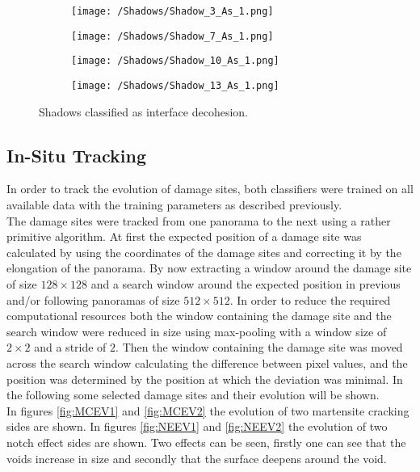 \begin{figure}[H]
\centering
\begin{subfigure}{0.24\textwidth}
\texttt{[image: /Shadows/Shadow\_3\_As\_1.png]}
\caption{}
\end{subfigure}
\centering
\begin{subfigure}{0.24\textwidth}
\texttt{[image: /Shadows/Shadow\_7\_As\_1.png]}
\caption{}
\end{subfigure}
\centering
\begin{subfigure}{0.24\textwidth}
\texttt{[image: /Shadows/Shadow\_10\_As\_1.png]}
\caption{}
\end{subfigure}
\centering
\begin{subfigure}{0.24\textwidth}
\texttt{[image: /Shadows/Shadow\_13\_As\_1.png]}
\caption{}
\end{subfigure}
\caption{Shadows classified as interface decohesion.}
\label{fig:shadowAsID}
\end{figure}


\subsection{In-Situ Tracking}
In order to track the evolution of damage sites, both classifiers were trained on all available data with the training parameters as described previously. \\

The damage sites were tracked from one panorama to the next using a rather primitive algorithm. At first the expected position of a damage site was calculated by using the coordinates of the damage sites and correcting it by the elongation of the panorama. By now extracting a window around the damage site of size $128\times 128$ and a search window around the expected position in previous and/or following panoramas of size $512 \times 512$. In order to reduce the required computational resources both the window containing the damage site and the search window were reduced in size using max-pooling with a window size of $2\times 2$ and a stride of $2$. Then the window containing the damage site was moved across the search window calculating the difference between pixel values, and the position was determined by the position at which the deviation was minimal. In the following some selected damage sites and their evolution will be shown. \\

In figures \ref{fig:MCEV1} and \ref{fig:MCEV2} the evolution of two martensite cracking sides are shown. In figures \ref{fig:NEEV1} and \ref{fig:NEEV2} the evolution of two notch effect sides are shown. Two effects can be seen, firstly one can see that the voids increase in size and secondly that the surface deepens around the void. \\

